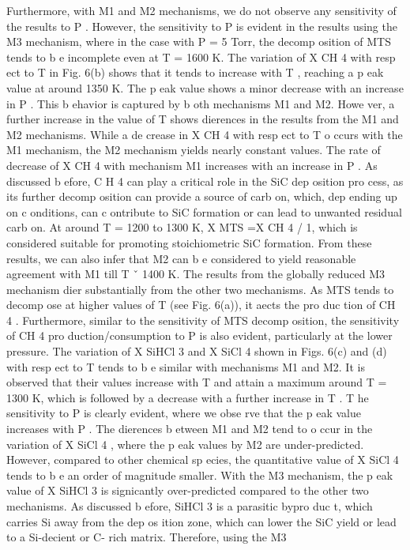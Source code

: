 \documentclass[10pt, letterpaper]{article}
\begin{document}
Furthermore, with M1 and M2 mechanisms, we do not observe any sensitivity of the results to
P
. However,
the sensitivity to
P
is evident in the results using the M3 mechanism, where in the case with
P
= 5 Torr,
the decomp osition of MTS tends to b e incomplete even at
T
= 1600 K.
The variation of
X
CH
4
with resp ect to
T
in Fig. 6(b) shows that it tends to increase with
T
, reaching a
p eak value at around 1350 K. The p eak value shows a minor decrease with an increase in
P
. This b ehavior is
captured by b oth mechanisms M1 and M2. Howe ver, a further increase in the value of
T
shows dierences in
the results from the M1 and M2 mechanisms. While a de crease in
X
CH
4
with resp ect to
T
o ccurs with the M1
mechanism, the M2 mechanism yields nearly constant values. The rate of decrease of
X
CH
4
with mechanism
M1 increases with an increase in
P
. As discussed b efore, C H
4
can play a critical role in the SiC dep osition
pro cess, as its further decomp osition can provide a source of carb on, which, dep ending up on c onditions,
can c ontribute to SiC formation or can lead to unwanted residual carb on. At around
T
= 1200
to
1300 K,
X
MTS
=X
CH
4
/
1, which is considered suitable for promoting stoichiometric SiC formation. From these
results, we can also infer that M2 can b e considered to yield reasonable agreement with M1 till
T
ˇ
1400 K.
The results from the globally reduced M3 mechanism dier substantially from the other two mechanisms. As
MTS tends to decomp ose at higher values of
T
(see Fig. 6(a)), it aects the pro duc tion of CH
4
. Furthermore,
similar to the sensitivity of MTS decomp osition, the sensitivity of CH
4
pro duction/consumption to
P
is also
evident, particularly at the lower pressure.
The variation of
X
SiHCl
3
and
X
SiCl
4
shown in Figs. 6(c) and (d) with resp ect to
T
tends to b e similar
with mechanisms M1 and M2. It is observed that their values increase with
T
and attain a maximum around
T
= 1300 K, which is followed by a decrease with a further increase in
T
. T he sensitivity to
P
is clearly
evident, where we obse rve that the p eak value increases with
P
. The dierences b etween M1 and M2 tend
to o ccur in the variation of
X
SiCl
4
, where the p eak values by M2 are under-predicted. However, compared
to other chemical sp ecies, the quantitative value of
X
SiCl
4
tends to b e an order of magnitude smaller. With
the M3 mechanism, the p eak value of
X
SiHCl
3
is signicantly over-predicted compared to the other two
mechanisms. As discussed b efore, SiHCl
3
is a parasitic bypro duc t, which carries Si away from the dep os ition
zone, which can lower the SiC yield or lead to a Si-decient or C- rich matrix. Therefore, using the M3
\end{document}
